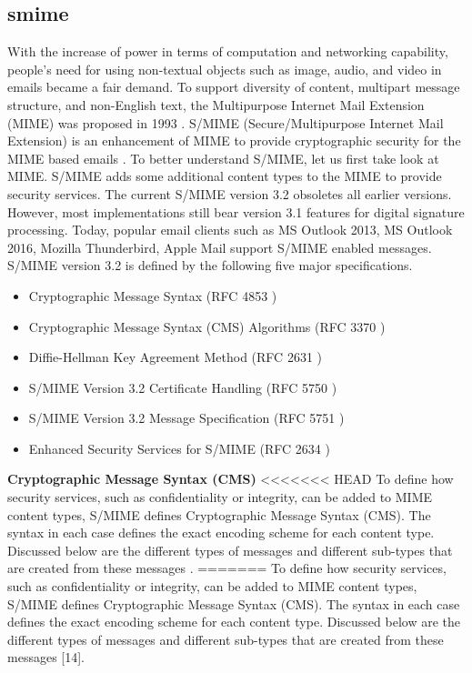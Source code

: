 \subsection{\acrfull{smime}}
\label{chap:analysis-smime}

With the increase of power in terms of computation and networking capability, people's need for using non-textual objects such as image, audio, and video in emails became a fair demand. To support diversity of content, multipart message structure, and non-English text, the Multipurpose Internet Mail Extension (MIME) was proposed in 1993 \cite{rfc1521}. S/MIME (Secure/Multipurpose Internet Mail Extension) is an enhancement of MIME to provide cryptographic security for the MIME based emails \cite{rfc1521}. To better understand S/MIME, let us first take look at MIME.
S/MIME adds some additional content types to the MIME to provide security services. The current S/MIME version 3.2 obsoletes all earlier versions. However, most implementations still bear version 3.1 features for digital signature processing. Today, popular email clients such as MS Outlook 2013, MS Outlook 2016, Mozilla Thunderbird, Apple Mail support S/MIME enabled messages.
S/MIME version 3.2 is defined by the following five major specifications.
\begin{itemize}
\item Cryptographic Message Syntax (RFC 4853 \cite{rfc4853})
\item Cryptographic Message Syntax (CMS) Algorithms (RFC 3370 \cite{rfc3370})
\item Diffie-Hellman Key Agreement Method (RFC 2631 \cite{rfc2631})
\item S/MIME Version 3.2 Certificate Handling (RFC 5750 \cite{rfc5750})
\item S/MIME Version 3.2 Message Specification (RFC 5751 \cite{rfc5751})
\item Enhanced Security Services for S/MIME (RFC 2634 \cite{rfc2634})
\end{itemize}
\textbf{Cryptographic Message Syntax (CMS)}
<<<<<<< HEAD
To define how security services, such as confidentiality or integrity, can be added to MIME content types, S/MIME defines Cryptographic Message Syntax (CMS). The syntax in each case defines the exact encoding scheme for each content type. Discussed below are the different types of messages and different sub-types that are created from these messages \cite{PKCS-7}.
=======
\newline
To define how security services, such as confidentiality or integrity, can be added to MIME content types, S/MIME defines Cryptographic Message Syntax (CMS). The syntax in each case defines the exact encoding scheme for each content type. Discussed below are the different types of messages and different sub-types that are created from these messages [14].

